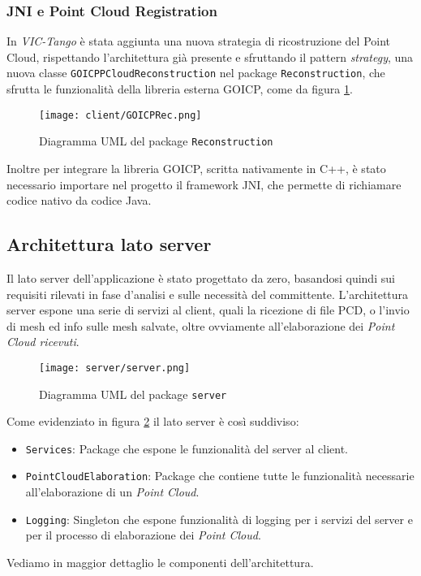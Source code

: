 \subsubsection{JNI e Point Cloud Registration}
In \emph{VIC-Tango} è stata aggiunta una nuova strategia di ricostruzione del Point Cloud, rispettando l'architettura già presente e sfruttando il pattern \emph{strategy}, una nuova classe \texttt{GOICPPCloudReconstruction} nel package \texttt{Reconstruction}, che sfrutta le funzionalità della libreria esterna GOICP, come da figura \ref{fig:GOICPRec}.
\begin{figure}[!h] 
    \centering 
    \texttt{[image: client/GOICPRec.png]} 
    \caption{Diagramma UML del package \texttt{Reconstruction}}
   \label{fig:GOICPRec}
\end{figure}
Inoltre per integrare la libreria GOICP, scritta nativamente in C++, è stato necessario importare nel progetto il framework JNI, che permette di richiamare codice nativo da codice Java.
\newpage



\subsection{Architettura lato server}
Il lato server dell'applicazione è stato progettato da zero, basandosi quindi sui requisiti rilevati in fase d'analisi e sulle necessità del committente.
L'architettura server espone una serie di servizi al client, quali la ricezione di file PCD, o l'invio di mesh ed info sulle mesh salvate, oltre ovviamente all'elaborazione dei \emph{Point Cloud ricevuti}.
\begin{figure}[!h] 
    \centering 
    \texttt{[image: server/server.png]} 
    \caption{Diagramma UML del package \texttt{server}}
   \label{fig:server}
\end{figure}
Come evidenziato in figura \ref{fig:server} il lato server è così suddiviso:
\begin{itemize}
\item\texttt{Services}: Package che espone le funzionalità del server al client.
\item\texttt{PointCloudElaboration}: Package che contiene tutte le funzionalità necessarie all'elaborazione di un \emph{Point Cloud}.
\item\texttt{Logging}: Singleton che espone funzionalità di logging per i servizi del server e per il processo di elaborazione dei \emph{Point Cloud}.
\end{itemize}
Vediamo in maggior dettaglio le componenti dell'architettura.

